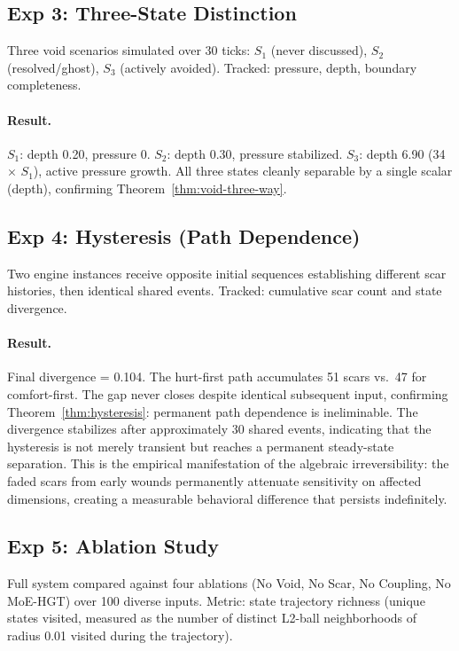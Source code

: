 \documentclass[11pt]{article}
\begin{document}
\subsection{Exp 3: Three-State Distinction}

Three void scenarios simulated over 30 ticks: $S_1$ (never discussed), $S_2$ (resolved/ghost), $S_3$ (actively avoided). Tracked: pressure, depth, boundary completeness.

\paragraph{Result.} $S_1$: depth 0.20, pressure 0. $S_2$: depth 0.30, pressure stabilized. $S_3$: depth 6.90 (34$\times$ $S_1$), active pressure growth. All three states cleanly separable by a single scalar (depth), confirming Theorem~\ref{thm:void-three-way}.

\subsection{Exp 4: Hysteresis (Path Dependence)}

Two engine instances receive opposite initial sequences establishing different scar histories, then identical shared events. Tracked: cumulative scar count and state divergence.

\paragraph{Result.} Final divergence = 0.104. The hurt-first path accumulates 51 scars vs.\ 47 for comfort-first. The gap never closes despite identical subsequent input, confirming Theorem~\ref{thm:hysteresis}: permanent path dependence is ineliminable. The divergence stabilizes after approximately 30 shared events, indicating that the hysteresis is not merely transient but reaches a permanent steady-state separation. This is the empirical manifestation of the algebraic irreversibility: the faded scars from early wounds permanently attenuate sensitivity on affected dimensions, creating a measurable behavioral difference that persists indefinitely.

\subsection{Exp 5: Ablation Study}

Full system compared against four ablations (No Void, No Scar, No Coupling, No MoE-HGT) over 100 diverse inputs. Metric: state trajectory richness (unique states visited, measured as the number of distinct L2-ball neighborhoods of radius 0.01 visited during the trajectory).
\end{document}
